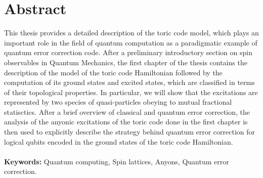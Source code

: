 \documentclass{Configuration_Files/PoliMi3i_thesis}
\begin{document}


\pagestyle{empty} %
\frontmatter %


\startpreamble
\setcounter{page}{1} %

\chapter*{Abstract} 
This thesis provides a detailed description of the toric code model, which plays an important
role in the field of quantum computation as a paradigmatic example of quantum error correction code. 
After a preliminary introductory section on spin observables in Quantum Mechanics, the first chapter of the thesis contains the description of the model of the toric code Hamiltonian followed by the computation of its ground states and excited states, which are classified in terms of their topological properties. In particular, we will show that the excitations are represented by two species of quasi-particles obeying to mutual fractional statisctics. After a brief overview of classical and quantum error correction, the analysis of the anyonic excitations of the toric code done in the first chapter is then used to explicitly describe the strategy behind quantum error correction for logical qubits encoded in the ground states of the toric code Hamiltonian.
\\
\\
\textbf{Keywords:} Quantum computing, Spin lattices, Anyons, Quantum error correction. %
\end{document}
